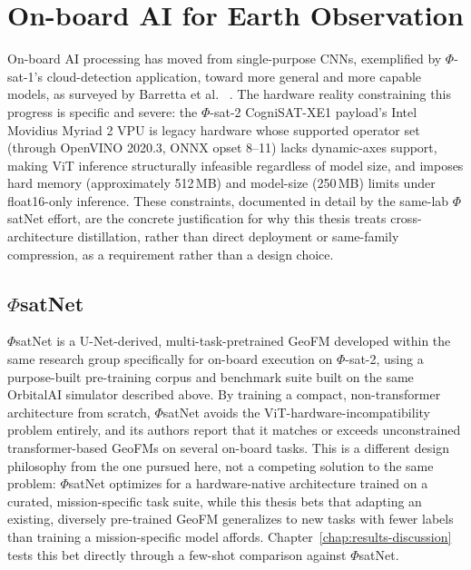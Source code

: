 \section{On-board AI for Earth Observation}
\label{sec:onboard-ai}

On-board AI processing has moved from single-purpose CNNs, exemplified by $\Phi$-sat-1's cloud-detection application\cite{giuffrida2021varphi}, toward more general and more capable models, as surveyed by Barretta et al.
\ \cite{barretta2026onboardaireview}.
The hardware reality constraining this progress is specific and severe: the $\Phi$-sat-2 CogniSAT-XE1 payload's Intel Movidius Myriad 2 VPU \cite{myriad2} is legacy hardware whose supported operator set (through OpenVINO 2020.3, ONNX opset 8--11) lacks dynamic-axes support, making ViT inference structurally infeasible regardless of model size, and imposes hard memory (approximately 512\,MB) and model-size (250\,MB) limits under float16-only inference.
These constraints, documented in detail by the same-lab $\Phi$satNet effort, are the concrete justification for why this thesis treats cross-architecture distillation, rather than direct deployment or same-family compression, as a requirement rather than a design choice.

\subsection{$\Phi$satNet}
\label{sec:phisatnet-background}

$\Phi$satNet is a U-Net-derived, multi-task-pretrained GeoFM developed within the same research group specifically for on-board execution on $\Phi$-sat-2, using a purpose-built pre-training corpus and benchmark suite built on the same OrbitalAI simulator described above.
By training a compact, non-transformer architecture from scratch, $\Phi$satNet avoids the ViT-hardware-incompatibility problem entirely, and its authors report that it matches or exceeds unconstrained transformer-based GeoFMs on several on-board tasks.
This is a different design philosophy from the one pursued here, not a competing solution to the same problem: $\Phi$satNet optimizes for a hardware-native architecture trained on a curated, mission-specific task suite, while this thesis bets that adapting an existing, diversely pre-trained GeoFM generalizes to new tasks with fewer labels than training a mission-specific model affords.
Chapter~\ref{chap:results-discussion} tests this bet directly through a few-shot comparison against $\Phi$satNet.

